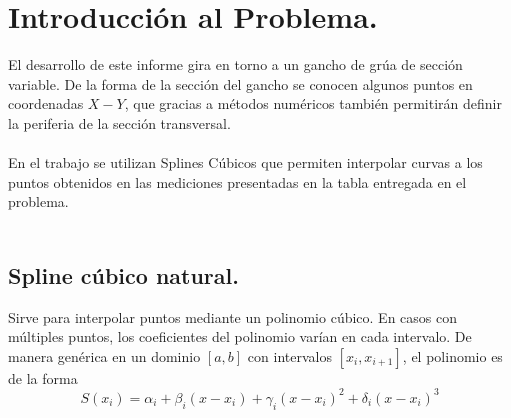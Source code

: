 \documentclass[12pt, notitlepage]{article}
\begin{document}
\section{Introducción al Problema.}

El desarrollo de este informe gira en torno a un gancho de grúa de sección variable. De la forma de la sección del gancho se conocen algunos puntos en coordenadas $X-Y$, que gracias a métodos numéricos también permitirán definir la periferia de la sección transversal.\\\\
En el trabajo se utilizan Splines Cúbicos que permiten interpolar curvas a los puntos obtenidos en las mediciones presentadas en la tabla entregada en el problema.\\\\
\subsection{Spline cúbico natural.}

Sirve para interpolar puntos mediante un polinomio cúbico. En casos con múltiples puntos, los coeficientes del polinomio varían en cada intervalo. De manera genérica en un dominio $[a,b]$ con intervalos $[x_i,x_{i+1}]$, el polinomio es de la forma
\begin{equation}
S(x_i) = \alpha_i + \beta_i(x-x_i) + \gamma_i(x-x_i)^2 + \delta_i(x-x_i)^3
\end{equation}
\end{document}
